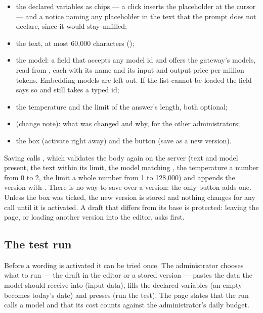 \begin{itemize}
  \item the declared variables as chips — a click inserts the placeholder at the cursor — and
    a notice naming any placeholder in the text that the prompt does not declare, since it
    would stay unfilled;
  \item the text, at most 60,000 characters ();
  \item the model: a field that accepts any model id and offers the gateway's models, read from
    , each with its name and its input and output price per million
    tokens. Embedding models are left out. If the list cannot be loaded the field says so and
    still takes a typed id;
  \item the temperature and the limit of the answer's length, both optional;
  \item {} (change note): what was changed and why, for the other
    administrators;
  \item the box  (activate right away) and the button  (save as a new version).
\end{itemize}

Saving calls , which validates the body again on the server (text and
model present, the text within its limit, the model matching , the temperature
a number from 0 to 2, the limit a whole number from 1 to 128,000) and appends the version with
. There is no way to save over a version: the only button adds one. Unless
the box was ticked, the new version is stored and nothing changes for any call until it is
activated. A draft that differs from its base is protected: leaving the page, or loading
another version into the editor, asks first.

\subsection{The test run}\label{sec:prompts:test}

Before a wording is activated it can be tried once. The administrator chooses what to run —
the draft in the editor or a stored version — pastes the data the model should receive into
 (input data), fills the declared variables (an empty 
becomes today's date) and presses  (run the test). The page states that
the run calls a model and that its cost counts against the administrator's daily budget.

